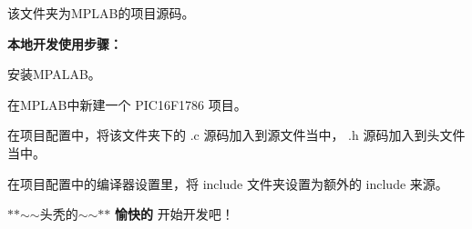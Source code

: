 该文件夹为\+M\+P\+L\+A\+B的项目源码。

{\bfseries{本地开发使用步骤：}}


\begin{DoxyEnumerate}
\item 安装\+M\+P\+A\+L\+A\+B。
\item 在\+M\+P\+L\+A\+B中新建一个 {\ttfamily P\+I\+C16\+F1786} 项目。
\item 在项目配置中，将该文件夹下的 {\ttfamily .c} 源码加入到源文件当中， {\ttfamily .h} 源码加入到头文件当中。
\item 在项目配置中的编译器设置里，将 {\ttfamily include} 文件夹设置为额外的 {\ttfamily include} 来源。
\item $\ast$$\ast$$\sim$$\sim$头秃的$\sim$$\sim$$\ast$$\ast$ {\bfseries{愉快的}} 开始开发吧！ 
\end{DoxyEnumerate}